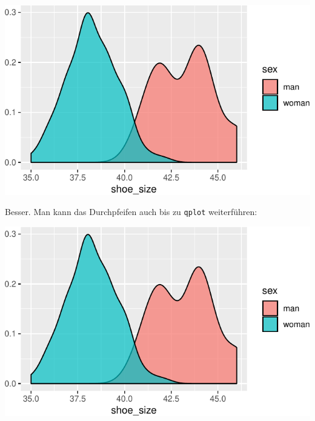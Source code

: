 \documentclass[12pt,ngerman,paper=a4,pagesize,DIV=13]{scrreprt}
\newenvironment{Shaded}{\begin{snugshade}}{\end{snugshade}}
\newcommand{\DataTypeTok}[1]{\textcolor[rgb]{0.13,0.29,0.53}{#1}}
\newcommand{\DecValTok}[1]{\textcolor[rgb]{0.00,0.00,0.81}{#1}}
\newcommand{\FloatTok}[1]{\textcolor[rgb]{0.00,0.00,0.81}{#1}}
\newcommand{\KeywordTok}[1]{\textcolor[rgb]{0.13,0.29,0.53}{\textbf{#1}}}
\newcommand{\NormalTok}[1]{#1}
\newcommand{\OperatorTok}[1]{\textcolor[rgb]{0.81,0.36,0.00}{\textbf{#1}}}
\newcommand{\StringTok}[1]{\textcolor[rgb]{0.31,0.60,0.02}{#1}}
\begin{document}
\includegraphics{DatenerhebungStatistik-Uebung_files/figure-latex/unnamed-chunk-243-1.pdf}

Besser. Man kann das Durchpfeifen auch bis zu \texttt{qplot}
weiterführen:

\begin{Shaded}
\end{Shaded}

\includegraphics{DatenerhebungStatistik-Uebung_files/figure-latex/unnamed-chunk-244-1.pdf}
\end{document}
